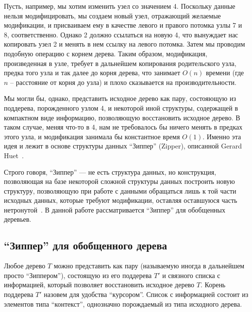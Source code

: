 Пусть, например, мы хотим изменить узел со значением 4. Поскольку данные нельзя модифицировать, мы создаем новый узел, отражающий желаемые модификации, и присваиваем ему в качестве левого и правого потомка узлы 7 и 8, соответственно. Однако 2 должно ссылаться на новую 4, что вынуждает нас копировать узел 2 и менять в нем ссылку на левого потомка. Затем мы проводим подобную операцию с корнем дерева. Таким образом, модификация, произведенная в узле, требует в дальнейшем копирования родительского узла, предка того узла и так далее до корня дерева, что занимает $O(n)$ времени (где $n$ -- расстояние от корня до узла) и плохо сказывается на производительности.

Мы могли бы, однако, представить исходное дерево как пару, состояющую из поддерева, порожденного узлом 4, и некоторой иной структуры, содержащей в компактном виде информацию, позволяющую восстановить исходное дерево. В таком случае, меняя что-то в 4, нам не требовалось бы ничего менять в предках этого узла, и модификация занимала бы константное время $O(1)$. Именно эта идея и лежит в основе структуры данных ``Зиппер'' (Zipper), описанной Gerard Huet~\autocite{Huet1997}.

Строго говоря, ``Зиппер'' --- не есть структура данных, но конструкция, позволяющая на базе некоторой сложной структуры данных построить новую структуру, позволяющую при работе с данными обращаться лишь к той части исходных данных, которые требуют модификации, оставляя оставшуюся часть нетронутой~\autocite{Huet1997}. В данной работе рассматривается ``Зиппер'' для обобщенных деревьев.

\subsection{``Зиппер'' для обобщенного дерева}

Любое дерево $T$ можно представить как пару (называемую иногда в дальнейшем просто ``Зиппером''), состоящую из его поддерева $T'$ и связного списка с информацией, который позволяет восстановить исходное дерево $T$. Корень поддерева $T'$ назовем для удобства ``курсором''. Список с информацией состоит из элементов типа ``контекст'', однозначно порождаемый из типа исходного дерева.

